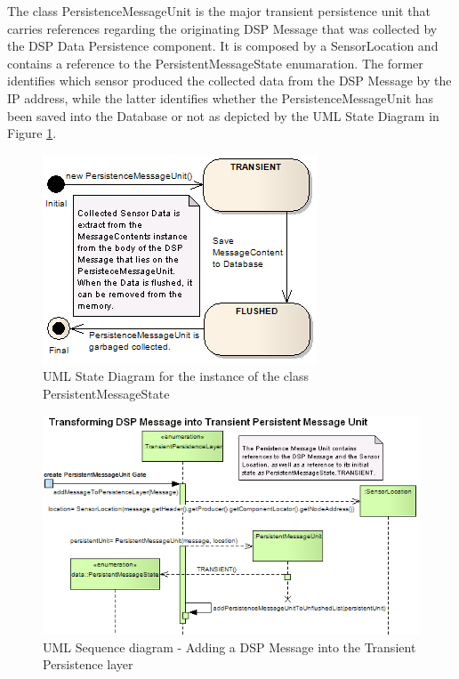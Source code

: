 The class PersistenceMessageUnit is the major transient persistence unit that
carries references regarding the originating DSP Message that was collected by
the DSP Data Persistence component. It is composed by a SensorLocation and
contains a reference to the PersistentMessageState enumaration. The former
identifies which sensor produced the collected data from the DSP Message by the
IP address, while the latter identifies whether the PersistenceMessageUnit has
been saved into the Database or not as depicted by the UML State Diagram in
Figure \ref{fig:PersistentMessageState-Diagram}.

\begin{figure}[!b]
  \centering
  \includegraphics[scale=0.5]{../diagrams/PersistentMessageState-Diagram}
  \caption{UML State Diagram for the instance of the class
  PersistentMessageState}
  \label{fig:PersistentMessageState-Diagram}
\end{figure}

\begin{figure}[!b]
  \centering
  \includegraphics[scale=0.5]{../diagrams/From-Create-PersistentMessageUnit-to-TransientPersistence-Layer-Sequence}
  \caption{UML Sequence diagram - Adding a DSP Message into the Transient Persistence layer}
  \label{fig:From-Create-PersistentMessageUnit-to-TransientPersistence-Layer-Sequence}
\end{figure}

